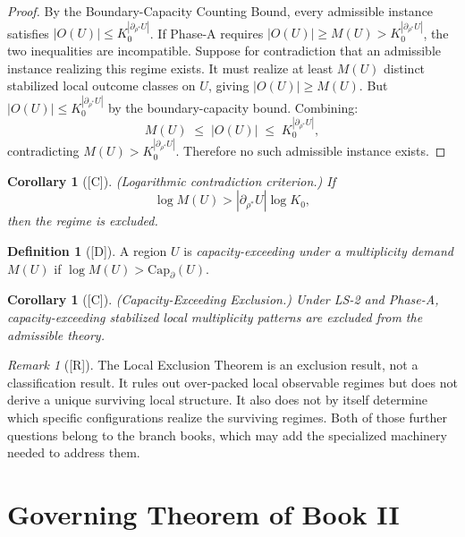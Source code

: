 \documentclass[12pt,oneside]{amsbook}
\theoremstyle{plain}
\newtheorem{corollary}[theorem]{Corollary}
\theoremstyle{definition}
\newtheorem{definition}[theorem]{Definition}
\theoremstyle{remark}
\newtheorem{remark}[theorem]{Remark}
\newcommand{\status}[1]{\textup{[#1]}}
\begin{document}
\begin{proof}
By the Boundary-Capacity Counting Bound, every admissible instance
satisfies $|O(U)| \leq K_0^{|\partial_{\rho^*} U|}$.  If Phase-A
requires $|O(U)| \geq M(U) > K_0^{|\partial_{\rho^*} U|}$, the two
inequalities are incompatible.  Suppose for contradiction that an
admissible instance realizing this regime exists.  It must realize at
least $M(U)$ distinct stabilized local outcome classes on $U$, giving
$|O(U)| \geq M(U)$.  But $|O(U)| \leq K_0^{|\partial_{\rho^*} U|}$
by the boundary-capacity bound.  Combining:
\[
  M(U) \;\leq\; |O(U)| \;\leq\; K_0^{|\partial_{\rho^*} U|},
\]
contradicting $M(U) > K_0^{|\partial_{\rho^*} U|}$.  Therefore no
such admissible instance exists.
\end{proof}

\begin{corollary}[\status{C}]\label{cor:log-contradiction}
\textup{(Logarithmic contradiction criterion.)}  If
\[
  \log M(U) > |\partial_{\rho^*} U| \log K_0,
\]
then the regime is excluded.
\end{corollary}

\begin{definition}[\status{D}]\label{def:capacity-exceeding}
A region $U$ is \emph{capacity-exceeding under a multiplicity demand
$M(U)$} if $\log M(U) > \mathrm{Cap}_\partial(U)$.
\end{definition}

\begin{corollary}[\status{C}]\label{cor:local-exclusion}
\textup{(Capacity-Exceeding Exclusion.)}  Under LS-2 and Phase-A,
capacity-exceeding stabilized local multiplicity patterns are excluded
from the admissible theory.
\end{corollary}

\begin{remark}[\status{R}]\label{rmk:exclusion-not-classification}
The Local Exclusion Theorem is an exclusion result, not a
classification result.  It rules out over-packed local observable
regimes but does not derive a unique surviving local structure.  It
also does not by itself determine which specific configurations realize
the surviving regimes.  Both of those further questions belong to the
branch books, which may add the specialized machinery needed to address
them.
\end{remark}

\section{Governing Theorem of Book II}
\end{document}
